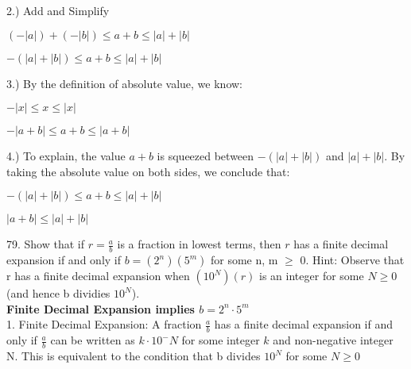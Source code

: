 \documentclass{article}
\begin{document}
2.) Add and Simplify\\
\begin{center}$(-\left|a\right|)+(-\left| b\right|) \leq a + b \leq \left|a\right| + \left|b\right|$\\\end{center}
\begin{center}$-(\left|a\right| + \left|b\right|) \leq a + b \leq \left|a\right| + \left|b\right|$\\\end{center}

3.) By the definition of absolute value, we know:\\
\begin{center}$-\left|x\right| \leq x \leq \left|x\right|$\\\end{center}
\begin{center}$-\left|a+b\right| \leq a+b \leq \left|a+b\right|$\\\end{center}

4.) To explain, the value $a + b$ is squeezed between $-(\left|a\right| + \left|b\right|)$ and $\left|a\right| + \left|b\right|$. By taking the absolute value on both sides, we conclude that: \\
\begin{center}$-(\left|a\right| + \left|b\right|) \leq a + b \leq \left|a\right| + \left|b\right|$\\\end{center}
\begin{center}$\left|a + b\right| \leq \left|a\right| + \left|b\right|$\\\end{center}

79. Show that if $r=\frac{a}{b}$ is a fraction in lowest terms, then $r$ has a finite decimal expansion if and only if $b = (2^n)(5^m)$ for some n, m $\geq$ 0. Hint: Observe that r has a finite decimal expansion when $(10^N)(r)$ is an integer for some $N\geq0$ (and hence b dividies $10^N$).\\

\textbf{Finite Decimal Expansion implies $b = 2^n \cdot 5^m$}\\

1. Finite Decimal Expansion: A fraction $\frac{a}{b}$ has a finite decimal expansion if and only if $\frac{a}{b}$ can be written as $k \cdot 10^-N$ for some integer $k$ and non-negative integer N. This is equivalent to the condition that b divides $10^N$ for some $N \geq 0$\\
\end{document}
